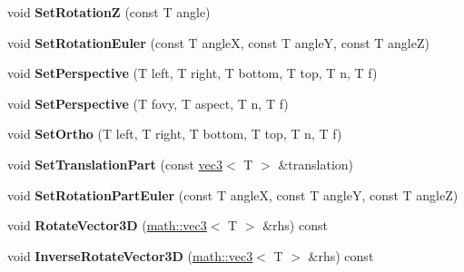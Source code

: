 \begin{DoxyCompactItemize}
\item 
\hypertarget{classmath_1_1mat44_a5707e8c3e1f52ba05809b210103bbe8a}{
void {\bfseries SetRotationZ} (const T angle)}
\label{classmath_1_1mat44_a5707e8c3e1f52ba05809b210103bbe8a}

\item 
\hypertarget{classmath_1_1mat44_a06461181117c5c083bd4a2941b1a70fc}{
void {\bfseries SetRotationEuler} (const T angleX, const T angleY, const T angleZ)}
\label{classmath_1_1mat44_a06461181117c5c083bd4a2941b1a70fc}

\item 
\hypertarget{classmath_1_1mat44_ab8eb695a7a330941ffeab9a17c14e36c}{
void {\bfseries SetPerspective} (T left, T right, T bottom, T top, T n, T f)}
\label{classmath_1_1mat44_ab8eb695a7a330941ffeab9a17c14e36c}

\item 
\hypertarget{classmath_1_1mat44_afd9ae3ec67c631724edca366a6b518cf}{
void {\bfseries SetPerspective} (T fovy, T aspect, T n, T f)}
\label{classmath_1_1mat44_afd9ae3ec67c631724edca366a6b518cf}

\item 
\hypertarget{classmath_1_1mat44_a6978c6c7b4303eb2defcbaecf24892b3}{
void {\bfseries SetOrtho} (T left, T right, T bottom, T top, T n, T f)}
\label{classmath_1_1mat44_a6978c6c7b4303eb2defcbaecf24892b3}

\item 
\hypertarget{classmath_1_1mat44_a539b0943a34a8946341aef1581c94f99}{
void {\bfseries SetTranslationPart} (const \hyperlink{classmath_1_1vec3}{vec3}$<$ T $>$ \&translation)}
\label{classmath_1_1mat44_a539b0943a34a8946341aef1581c94f99}

\item 
\hypertarget{classmath_1_1mat44_ae4de5a2608b6cd1fbd64e47191900855}{
void {\bfseries SetRotationPartEuler} (const T angleX, const T angleY, const T angleZ)}
\label{classmath_1_1mat44_ae4de5a2608b6cd1fbd64e47191900855}

\item 
\hypertarget{classmath_1_1mat44_afeb47bdf4c2f9079dda4716e345e9358}{
void {\bfseries RotateVector3D} (\hyperlink{classmath_1_1vec3}{math::vec3}$<$ T $>$ \&rhs) const }
\label{classmath_1_1mat44_afeb47bdf4c2f9079dda4716e345e9358}

\item 
\hypertarget{classmath_1_1mat44_acfd656b0d4115099a8ea6411d7c55d03}{
void {\bfseries InverseRotateVector3D} (\hyperlink{classmath_1_1vec3}{math::vec3}$<$ T $>$ \&rhs) const }
\label{classmath_1_1mat44_acfd656b0d4115099a8ea6411d7c55d03}


\end{DoxyCompactItemize}
